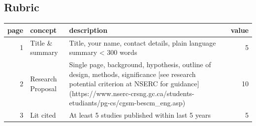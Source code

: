 \documentclass[
]{book}
\begin{document}
\hypertarget{rubric-1}{%
\subsection*{Rubric}\label{rubric-1}}

\begin{tabular}{r|l|l|r}
\hline
page & concept & description & value\\
\hline
1 & Title \& summary & Title, your name, contact details, plain language summary < 300 words & 5\\
\hline
2 & Research Proposal & Single page, background, hypothesis, outline of design, methods, significance [see research potential criterion at NSERC for guidance](https://www.nserc-crsng.gc.ca/students-etudiants/pg-cs/cgsm-bescm\_eng.asp) & 10\\
\hline
3 & Lit cited & At least 5 studies published within last 5 years & 5\\
\hline
\end{tabular}

  
\end{document}
